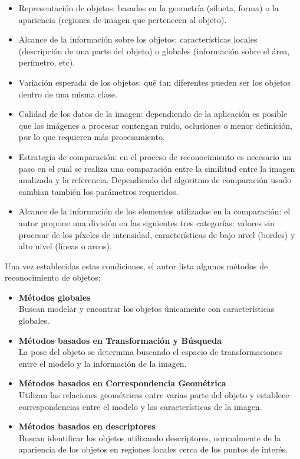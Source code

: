 \begin{itemize}
    \item Representación de objetos: basados en la geometría (silueta, forma) o la apariencia (regiones de imagen que pertenecen al objeto).
    \item Alcance de la información sobre los objetos: características locales (descripción de una parte del objeto) o globales (información sobre el área, perímetro, etc).
    \item Variación esperada de los objetos: qué tan diferentes pueden ser los objetos dentro de una misma clase.
    \item Calidad de los datos de la imagen: dependiendo de la aplicación es posible que las imágenes a procesar contengan ruido, oclusiones o menor definición, por lo que requieren más procesamiento.
    \item Estrategia de comparación: en el proceso de reconocimiento es necesario un paso en el cual se realiza una comparación entre la similitud entre la imagen analizada y la referencia. Dependiendo del algoritmo de comparación usado cambian también los parámetros requeridos.
    \item Alcance de la información de los elementos utilizados en la comparación: el autor propone una división en las siguientes tres categorías: valores sin procesar de los píxeles de intensidad, características de bajo nivel (bordes) y alto nivel (líneas o arcos). 
\end{itemize}

Una vez establecidas estas condiciones, el autor lista algunos métodos de reconocimiento de objetos:

\begin{itemize}
    \item \textbf{Métodos globales}\\ Buscan modelar y encontrar los objetos únicamente con características globales.
    \item \textbf{Métodos basados en Transformación y Búsqueda}\\ La pose del objeto se determina buscando el espacio de transformaciones entre el modelo y la información de la imagen.
    \item \textbf{Métodos basados en Correspondencia Geométrica}\\ Utilizan las relaciones geométricas entre varias parte del objeto y establece correspondencias entre el modelo y las características de la imagen.
    \item \textbf{Métodos basados en descriptores}\\ Buscan identificar los objetos utilizando descriptores, normalmente de la apariencia de los objetos en regiones locales cerca de los puntos de interés. 
\end{itemize}

